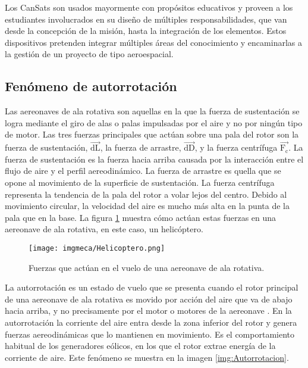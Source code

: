 \noindent Los CanSats son usados mayormente con prop\'ositos educativos y proveen a los estudiantes involucrados en su dise\~{n}o de m\'ultiples responsabilidades, que van desde la concepci\'on de la misi\'on, hasta la integraci\'on de los elementos. Estos dispositivos pretenden integrar m\'ultiples \'areas del conocimiento y encaminarlas a la gesti\'on de un proyecto de tipo aeroespacial.

		\subsection{Fen\'omeno de autorrotaci\'on} \label{subsec:autorot}
Las aereonaves de ala rotativa son aquellas en la que la fuerza de sustentaci\'on se logra mediante el giro de alas o palas impulsadas por el aire y no por ning\'un tipo de motor. Las tres fuerzas principales que act\'uan sobre una pala del rotor son la fuerza de sustentaci\'on, $\overrightarrow{\text{dL}}$, la fuerza de arrastre, $\overrightarrow{\text{dD}}$, y la fuerza centr\'ifuga $\overrightarrow{\text{F}_\text{c}}$. La fuerza de sustentaci\'on es la fuerza hacia arriba causada por la interacci\'on entre el flujo de aire y el perfil aereodin\'amico. La fuerza de arrastre es quella que se opone al movimiento de la superficie de sustentaci\'on. La fuerza centr\'ifuga representa la tendencia de la pala del rotor a volar lejos del centro. Debido al movimiento circular, la velocidad del aire es mucho m\'as alta en la punta de la pala que en la base. La figura \ref{img:Helicoptero} muestra c\'omo act\'uan estas fuerzas en una aereonave de ala rotativa, en este caso, un helic\'optero.

\begin{figure}[H]
	\centering
		\texttt{[image: imgmeca/Helicoptero.png]}
	\caption{Fuerzas que act\'uan en el vuelo de una aereonave de ala rotativa.}
	\label{img:Helicoptero}
\end{figure}

\noindent La autorrotaci\'on  es un estado de vuelo que se presenta cuando el rotor principal de una aereonave de ala rotativa es movido por acci\'on del aire que va de abajo hacia arriba, y no precisamente por el motor o motores de la aereonave \cite{autorotation_2008}. En la autorrotaci\'on la corriente del aire entra desde la zona inferior del rotor y genera fuerzas aereodin\'amicas que lo mantienen en movimiento. Es el comportamiento habitual de los generadores e\'olicos, en los que el rotor extrae energ\'ia de la corriente de aire. Este fen\'omeno se muestra en la imagen \ref{img:Autorrotacion}.

